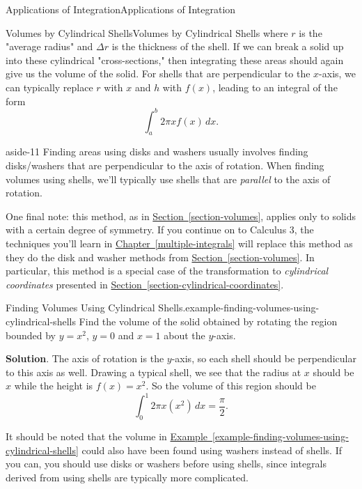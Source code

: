 \documentclass[10pt,]{book}
\numberwithin{equation}{section}
\begin{document}
\begin{chapterptx}{Applications of Integration}{}{Applications of Integration}{}{}
\begin{sectionptx}{Volumes by Cylindrical Shells}{}{Volumes by Cylindrical Shells}{}{}
where \(r\) is the "average radius" and \(\Delta r\) is the thickness of the shell. If we can break a solid up into these cylindrical "cross-sections," then integrating these areas should again give us the volume of the solid. For shells that are perpendicular to the \(x\)-axis, we can typically replace \(r\) with \(x\) and \(h\) with \(f(x)\), leading to an integral of the form%
\begin{equation*}
\int_{a}^{b}2\pi xf(x)\,dx.
\end{equation*}
\begin{aside}{}{aside-11}%
\hypertarget{p-640}{}%
Finding areas using disks and washers usually involves finding disks/washers that are perpendicular to the axis of rotation. When finding volumes using shells, we'll typically use shells that are \emph{parallel} to the axis of rotation.%
\end{aside}
%
\par
\hypertarget{p-641}{}%
One final note: this method, as in \hyperref[section-volumes]{Section~\ref{section-volumes}}, applies only to solids with a certain degree of symmetry. If you continue on to Calculus 3, the techniques you'll learn in \hyperref[multiple-integrals]{Chapter~\ref{multiple-integrals}} will replace this method as they do the disk and washer methods from \hyperref[section-volumes]{Section~\ref{section-volumes}}. In particular, this method is a special case of the transformation to \emph{cylindrical coordinates} presented in \hyperref[section-cylindrical-coordinates]{Section~\ref{section-cylindrical-coordinates}}.%
\begin{example}{Finding Volumes Using Cylindrical Shells.}{example-finding-volumes-using-cylindrical-shells}%
\hypertarget{p-642}{}%
Find the volume of the solid obtained by rotating the region bounded by \(y = x^{2}\), \(y = 0\) and \(x = 1\) about the \(y\)-axis.%
\par\smallskip%
\noindent\textbf{Solution}.\hypertarget{solution-140}{}\quad%
\hypertarget{p-643}{}%
The axis of rotation is the \(y\)-axis, so each shell should be perpendicular to this axis as well. Drawing a typical shell, we see that the radius at \(x\) should be \(x\) while the height is \(f(x) = x^{2}\). So the volume of this region should be%
\begin{equation*}
\int_{0}^{1}2\pi x(x^{2})\,dx = \frac{\pi}{2}.
\end{equation*}
%
\end{example}
\hypertarget{p-644}{}%
It should be noted that the volume in \hyperref[example-finding-volumes-using-cylindrical-shells]{Example~\ref{example-finding-volumes-using-cylindrical-shells}} could also have been found using washers instead of shells. If you can, you should use disks or washers before using shells, since integrals derived from using shells are typically more complicated.%

\end{sectionptx}
\end{chapterptx}
\end{document}

